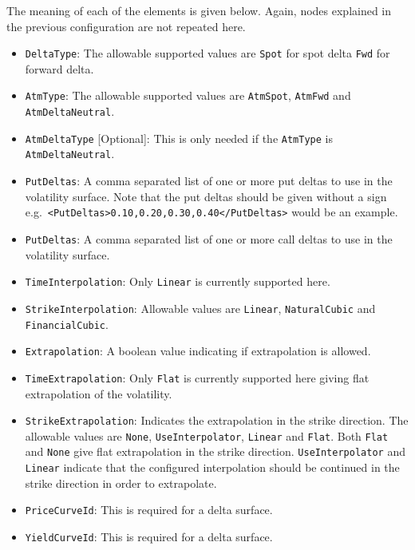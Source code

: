 The meaning of each of the elements is given below. Again, nodes explained in the previous configuration are not repeated here.
\begin{itemize}
\item \lstinline!DeltaType!:
The allowable supported values are \lstinline!Spot! for spot delta \lstinline!Fwd! for forward delta.

\item \lstinline!AtmType!:
The allowable supported values are \lstinline!AtmSpot!, \lstinline!AtmFwd! and \lstinline!AtmDeltaNeutral!.

\item \lstinline!AtmDeltaType! [Optional]:
This is only needed if the \lstinline!AtmType! is \lstinline!AtmDeltaNeutral!.

\item \lstinline!PutDeltas!:
A comma separated list of one or more put deltas to use in the volatility surface. Note that the put deltas should be given without a sign e.g.\ \lstinline!<PutDeltas>0.10,0.20,0.30,0.40</PutDeltas>! would be an example.

\item \lstinline!PutDeltas!:
A comma separated list of one or more call deltas to use in the volatility surface.

\item \lstinline!TimeInterpolation!:
Only \lstinline!Linear! is currently supported here.

\item \lstinline!StrikeInterpolation!:
Allowable values are \lstinline!Linear!, \lstinline!NaturalCubic! and \lstinline!FinancialCubic!.

\item \lstinline!Extrapolation!:
A boolean value indicating if extrapolation is allowed.

\item \lstinline!TimeExtrapolation!:
Only \lstinline!Flat! is currently supported here giving flat extrapolation of the volatility.

\item \lstinline!StrikeExtrapolation!:
Indicates the extrapolation in the strike direction. The allowable values are \lstinline!None!, \lstinline!UseInterpolator!, \lstinline!Linear! and \lstinline!Flat!. Both \lstinline!Flat! and \lstinline!None! give flat extrapolation in the strike direction. \lstinline!UseInterpolator! and \lstinline!Linear! indicate that the configured interpolation should be continued in the strike direction in order to extrapolate.

\item \lstinline!PriceCurveId!:
This is required for a delta surface.

\item \lstinline!YieldCurveId!:
This is required for a delta surface.

\end{itemize}

